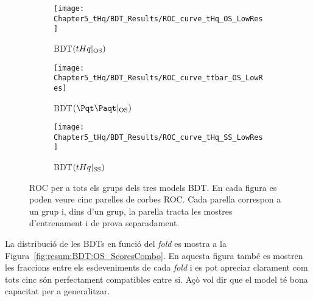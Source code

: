 \begin{figure}[h]
  \centering  
  \begin{subfigure}[b]{0.31\textwidth}
    \centering
    \texttt{[image: Chapter5\_tHq/BDT\_Results/ROC\_curve\_tHq\_OS\_LowRes]}
    \caption{BDT$(tHq|_{\text{OS}})$}
     \label{fig:resum:BDT:ROC_Curves:tHqOS}
  \end{subfigure}
  \hfill
  \begin{subfigure}[b]{0.31\textwidth}
    \centering
    \texttt{[image: Chapter5\_tHq/BDT\_Results/ROC\_curve\_ttbar\_OS\_LowRes]}
    \caption{BDT$(\ttbar|_{\text{OS}})$}
     \label{fig:resum:BDT:ROC_Curves:ttbarOS}
  \end{subfigure}
    \hfill
  \begin{subfigure}[b]{0.31\textwidth}
    \centering
    \texttt{[image: Chapter5\_tHq/BDT\_Results/ROC\_curve\_tHq\_SS\_LowRes]}
    \caption{BDT$(tHq|_{\text{SS}})$}
     \label{fig:resum:BDT:ROC_Curves:tHqSS}
  \end{subfigure}
  \caption{ROC per a tots els grups dels tres models BDT. En cada figura es poden veure cinc parelles de 
  	       corbes ROC. Cada parella correspon a un grup i, dins d'un grup, la parella tracta les mostres 
	       d'entrenament i de prova separadament.}
  \label{fig:resum:BDT:ROC_Curves}
\end{figure}

La distribució de les BDTs en funció del \textit{fold} es mostra a la Figura~\ref{fig:resum:BDT:OS_ScoresCombo}.
En aquesta figura també es mostren les fraccions entre els esdeveniments de cada \textit{fold} i es pot apreciar 
clarament com tots cinc són perfectament compatibles entre si. Açò vol dir que el model té bona capacitat per a 
generalitzar.


